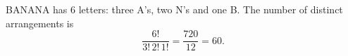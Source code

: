 BANANA has $6$ letters: three A's, two N's and one B. The number of distinct arrangements is
\[
\dfrac{6!}{3!\,2!\,1!}=\dfrac{720}{12}=\boxed{60}.
\]
